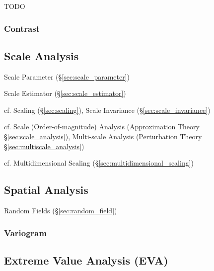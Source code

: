 TODO



\subsubsection{Contrast}\label{sec:contrast}



\subsection{Scale Analysis}\label{sec:statistical_scale}

Scale Parameter (\S\ref{sec:scale_parameter})

Scale Estimator (\S\ref{sec:scale_estimator})

cf. Scaling (\S\ref{sec:scaling}), Scale Invariance
(\S\ref{sec:scale_invariance})

\fist cf. Scale (Order-of-magnitude) Analysis (Approximation Theory
\S\ref{sec:scale_analysis}), Multi-scale Analysis (Perturbation Theory
\S\ref{sec:multiscale_analysis})

cf. Multidimensional Scaling (\S\ref{sec:multidimensional_scaling})



\subsection{Spatial Analysis}\label{sec:spatial_analysis}

Random Fields (\S\ref{sec:random_field})



\subsubsection{Variogram}\label{sec:variogram}



\subsection{Extreme Value Analysis (EVA)}\label{sec:eva}

